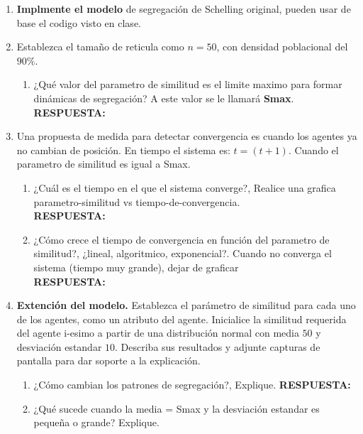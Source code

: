 \documentclass[12pt]{article}
\begin{document}
\begin{enumerate}
    \item \textbf{Implmente el modelo} de segregación de Schelling original, pueden usar de base el codigo visto en clase.
    \item Establezca el tamaño de reticula como $n=50$, con densidad poblacional del $90\%$.
    \begin{enumerate}
        \item ¿Qué valor del parametro de similitud es el limite maximo para formar dinámicas de segregación? A este valor se le llamará \textbf{Smax}.\\
        \textbf{\color{red} RESPUESTA:}\\
    \end{enumerate}
    \item Una propuesta de medida para detectar convergencia es cuando los agentes ya no cambian de posición. En tiempo el sistema es: $t = (t+1)$.
    Cuando el parametro de similitud es igual a Smax.\\
    \begin{enumerate}
        \item ¿Cuál es el tiempo en el que el sistema converge?, Realice una grafica parametro-similitud vs tiempo-de-convergencia.\\
        \textbf{\color{red} RESPUESTA:}\\
        \item ¿Cómo crece el tiempo de convergencia en función del parametro de similitud?, ¿lineal, algoritmico, exponencial?. Cuando no converga el sistema (tiempo muy grande), dejar de graficar\\
        \textbf{\color{red} RESPUESTA:}\\ 
    \end{enumerate}
    \item \textbf{Extención del modelo.} Establezca el parámetro de similitud para cada uno de los agentes, como un atributo del agente. Inicialice la similitud requerida del agente i-esimo a partir de
    una distribución normal con media $50$ y desviación estandar $10$. Describa sus resultados y adjunte capturas de pantalla para dar soporte a la explicación.\\
    \begin{enumerate}
        \item ¿Cómo cambian los patrones de segregación?, Explique.
        \textbf{\color{red} RESPUESTA:}\\
        \item ¿Qué sucede cuando la media = Smax y la desviación estandar es pequeña o grande? Explique.\\

\end{enumerate}
\end{enumerate}
\end{document}
